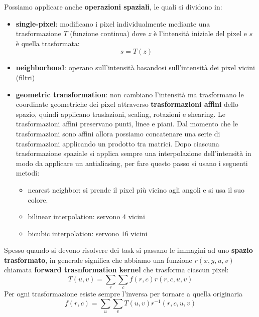 Possiamo applicare anche \textbf{operazioni spaziali}, le quali si dividono in:
\begin{itemize}
    \item \textbf{single-pixel}: modificano i pixel individualmente mediante una
          trasformazione $T$ (funzione continua) dove $z$ è l'intensità iniziale
          del pixel e $s$ è quella trasformata:
          \begin{equation}
              s=T(z)
          \end{equation}
    \item \textbf{neighborhood}: operano sull'intensità basandosi sull'intensità
          dei pixel vicini (filtri)
    \item \textbf{geometric transformation}: non cambiano l'intensità ma trasformano
          le coordinate geometriche dei pixel attraverso \textbf{trasformazioni
              affini} dello spazio, quindi applicano traslazioni, scaling,
          rotazioni e shearing. Le trasformazioni affini preservano punti, linee
          e piani. Dal momento che le trasformazioni sono affini allora possiamo
          concatenare una serie di trasformazioni applicando un prodotto tra matrici.
          Dopo ciascuna trasformazione spaziale si applica sempre una interpolazione
          dell'intensità in modo da applicare un antialiasing, per fare questo
          passo si usano i seguenti metodi:
          \begin{itemize}
              \item nearest neighbor: si prende il pixel più vicino agli angoli e si usa
                    il suo colore.
              \item bilinear interpolation: servono $4$ vicini
              \item bicubic interpolation: servono $16$ vicini
          \end{itemize}
\end{itemize}

Spesso quando si devono risolvere dei task si passano le immagini ad uno
\textbf{spazio trasformato}, in generale significa che abbiamo una funzione
$r(x,y,u,v)$ chiamata \textbf{forward trasnformation kernel} che trasforma ciascun
pixel:
\begin{equation}
    T(u,v) = \sum_r \sum_c f(r,c) r(r,c,u,v)
\end{equation}
Per ogni trasformazione esiste sempre l'inversa per tornare a quella originaria
\begin{equation}
    f(r,c) = \sum_u \sum_v T(u,v) r^{-1}(r,c,u,v)
\end{equation}

